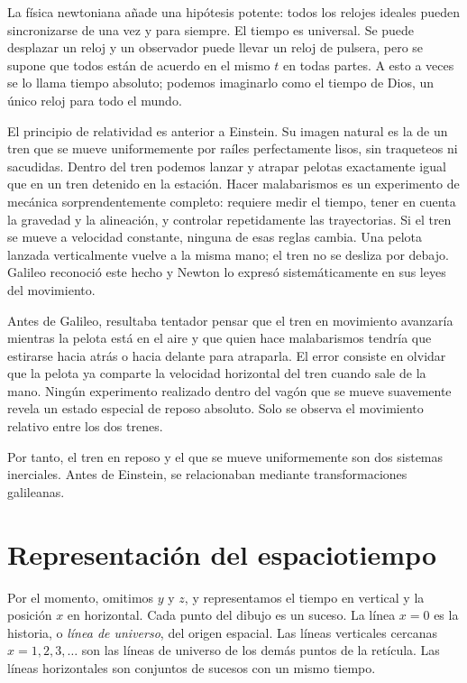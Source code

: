 La física newtoniana añade una hipótesis potente: todos los relojes ideales pueden sincronizarse de una vez y para siempre. El tiempo es universal. Se puede desplazar un reloj y un observador puede llevar un reloj de pulsera, pero se supone que todos están de acuerdo en el mismo \(t\) en todas partes. A esto a veces se lo llama tiempo absoluto; podemos imaginarlo como el tiempo de Dios, un único reloj para todo el mundo.

El principio de relatividad es anterior a Einstein. Su imagen natural es la de un tren que se mueve uniformemente por raíles perfectamente lisos, sin traqueteos ni sacudidas. Dentro del tren podemos lanzar y atrapar pelotas exactamente igual que en un tren detenido en la estación. Hacer malabarismos es un experimento de mecánica sorprendentemente completo: requiere medir el tiempo, tener en cuenta la gravedad y la alineación, y controlar repetidamente las trayectorias. Si el tren se mueve a velocidad constante, ninguna de esas reglas cambia. Una pelota lanzada verticalmente vuelve a la misma mano; el tren no se desliza por debajo. Galileo reconoció este hecho y Newton lo expresó sistemáticamente en sus leyes del movimiento.

Antes de Galileo, resultaba tentador pensar que el tren en movimiento avanzaría mientras la pelota está en el aire y que quien hace malabarismos tendría que estirarse hacia atrás o hacia delante para atraparla. El error consiste en olvidar que la pelota ya comparte la velocidad horizontal del tren cuando sale de la mano. Ningún experimento realizado dentro del vagón que se mueve suavemente revela un estado especial de reposo absoluto. Solo se observa el movimiento relativo entre los dos trenes.

Por tanto, el tren en reposo y el que se mueve uniformemente son dos sistemas inerciales. Antes de Einstein, se relacionaban mediante transformaciones galileanas.

\section{Representación del espaciotiempo}

Por el momento, omitimos \(y\) y \(z\), y representamos el tiempo en vertical y la posición \(x\) en horizontal. Cada punto del dibujo es un suceso. La línea \(x=0\) es la historia, o \emph{línea de universo}, del origen espacial. Las líneas verticales cercanas \(x=1,2,3,\ldots\) son las líneas de universo de los demás puntos de la retícula. Las líneas horizontales son conjuntos de sucesos con un mismo tiempo.

